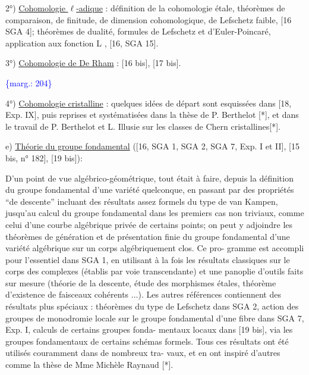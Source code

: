 \documentclass[11pt]{article}
\newcommand{\scanpage}[1]{\par\bigskip\noindent{\small\sffamily[scan #1]}\par}
\newcommand{\mspage}[1]{{\small\sffamily[p.\,#1]}}
\newcommand{\margin}[1]{\textcolor{blue}{\{\textsf{marg.:} #1\}}}
\newcommand{\uline}[1]{\underline{#1}}
\begin{document}
2°) \uline{Cohomologie $\ell$-adique} : définition de la cohomologie étale, théorèmes de
comparaison, de finitude, de dimension cohomologique, de Lefschetz faible,
[16 SGA 4]; théorèmes de dualité, formules de Lefschetz et d'Euler-Poincaré,
application aux fonction L , [16, SGA 15].

3°) \uline{Cohomologie de De Rham} : [16 bis], [17 bis].

\margin{204}

\clearpage
\scanpage{119/205}
\mspage{- 10 -}

4°) \uline{Cohomologie cristalline} : quelques idées de départ sont esquissées
dans [18, Exp. IX], puis reprises et systématisées dans la thèse de P. Berthelot
[*], et dans le travail de P. Berthelot et L. Illusie sur les classes de Chern
cristallines[*].

e) \uline{Théorie du groupe fondamental} ([16, SGA 1, SGA 2, SGA 7, Exp. I et II],
[15 bis, n° 182], [19 bis]):

D'un point de vue algébrico-géométrique, tout était à faire, depuis
la définition du groupe fondamental d'une variété quelconque, en passant par
des propriétés ``de descente'' incluant des résultats assez formels du type de
van Kampen, jusqu'au calcul du groupe fondamental dans les premiers cas non
triviaux, comme celui d'une courbe algébrique privée de certains points; on
peut y adjoindre les théorèmes de génération et de présentation finie du groupe
fondamental d'une variété algébrique sur un corps algébriquement clos. Ce pro-%
gramme est accompli pour l'essentiel dans SGA 1, en utilisant à la fois les
résultats classiques sur le corps des complexes (établis par voie transcendante)
et une panoplie d'outils faits sur mesure (théorie de la descente, étude des
morphismes étales, théorème d'existence de faisceaux cohérents ...). Les
autres références contiennent des résultats plus spéciaux : théorèmes du type
de Lefschetz dans SGA 2, action des groupes de monodromie locale sur le groupe
fondamental d'une fibre dans SGA 7, Exp. I, calculs de certains groupes fonda-%
mentaux locaux dans [19 bis], via les groupes fondamentaux de certains schémas
formels. Tous ces résultats ont été utilisés couramment dans de nombreux tra-%
vaux, et en ont inspiré d'autres comme la thèse de Mme Michèle Raynaud [*].
\end{document}
